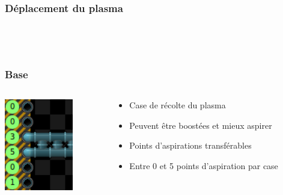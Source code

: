 \documentclass{beamer}
\begin{document}
\begin{frame}
	\frametitle{Déplacement du plasma}
    \begin{columns}[T]
        \begin{column}{.5\textwidth}
             \\
        \end{column}
        \begin{column}{.5\textwidth}
             \\
        \end{column}
    \end{columns}
\end{frame}

\begin{frame}
	\frametitle{Base}
    \begin{columns}[T]
        \begin{column}{.3\textwidth}
            \includegraphics[width=3cm]{pictures/aspiration}
        \end{column}
        \begin{column}{.7\textwidth}
            \begin{itemize}
                \item Case de récolte du plasma
                \item Peuvent être boostées et mieux aspirer
                \item Points d'aspirations transférables
                \item Entre 0 et 5 points d'aspiration par case
            \end{itemize}
        \end{column}
    \end{columns}
\end{frame}
\end{document}
